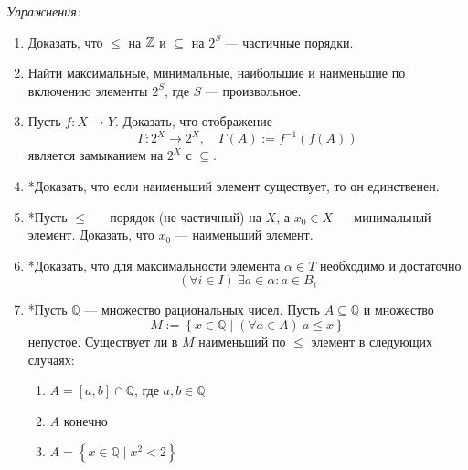 \newcommand\Q{\mathbb Q}
\vspace{1em}
{\it Упражнения:}
\begin{enumerate}
	\item{}Доказать, что $\leq$ на $\mathbb Z$ и $\subseteq$ на $2^{S}$ --- частичные порядки.
	\item{}Найти максимальные, минимальные, наибольшие и
		наименьшие по включению элементы $2^{S}$, где $S$ --- произвольное.
	\item{}Пусть $f:X\to Y$. Доказать, что отображение
		\[
			\Gamma:2^{X}\to 2^{X},\quad \Gamma(A):= f^{-1}(f(A))
		\]
		является замыканием на $2^{X}$ с $\subseteq$.
	\item{}*Доказать, что если наименьший элемент существует, то
		он единственен.
	\item{}*Пусть $\leq$ --- порядок (не частичный) на $X$, а $x_0\in X$ --- минимальный
		элемент. Доказать, что $x_0$ --- наименьший элемент.
	\item{}*Доказать, что для максимальности элемента $\alpha\in T$ необходимо
		и достаточно
		\[
			(\forall i\in I)~\exists a\in\alpha:a\in B_{i}
		\]
	\item{}*Пусть $\Q$ --- множество рациональных чисел.
		Пусть $A\subseteq \Q$ и множество
		\[
			M:=\left\{x\in \Q\;\big|\;(\forall a\in A)~a\leq x\right\}
		\]
		непустое. Существует ли в $M$ наименьший по $\leq$ элемент
		в следующих случаях:
		\begin{enumerate}
			\item{}$A=[a,b]\cap\Q$, где $a,b\in\Q$
			\item{}$A$ конечно
			\item{}$A=\left\{x\in\Q\;\big|\; x^{2}<2\right\}$
		\end{enumerate}
\end{enumerate}
